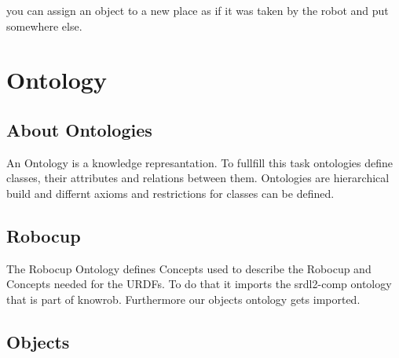 \documentclass[main.tex]{subfiles}
\begin{document}
you can assign an object to a new place as if it was taken by the robot and put somewhere else.

\section{Ontology}
\subsection{About Ontologies}
An Ontology is a knowledge represantation. To fullfill this task ontologies define classes, their attributes and relations between them. Ontologies are hierarchical build and differnt axioms and restrictions for classes can be defined.


\subsection{Robocup}
The Robocup Ontology defines Concepts used to describe the Robocup and Concepts needed for the URDFs. To do that it imports the srdl2-comp ontology that is part of knowrob. Furthermore our objects ontology gets imported.\\


\subsection{Objects}
\end{document}
